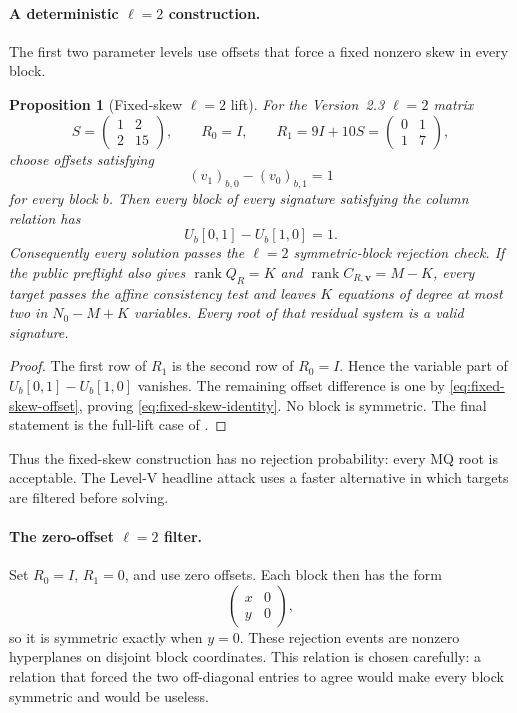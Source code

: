 \documentclass[11pt]{article}
\newtheorem{proposition}[proposition]{Proposition}
\newcommand{\rank}{\operatorname{rank}}
\begin{document}
\paragraph{A deterministic $\ell=2$ construction.}
The first two parameter levels use offsets that force a fixed nonzero skew in
every block.

\begin{proposition}[Fixed-skew $\ell=2$ lift]\label{prop:fixed-skew}
For the Version~2.3 $\ell=2$ matrix
\[
 S=\begin{pmatrix}1&2\\2&15\end{pmatrix},
 \qquad R_0=I,
 \qquad R_1=9I+10S=\begin{pmatrix}0&1\\1&7\end{pmatrix},
\]
choose offsets satisfying
\begin{equation}\label{eq:fixed-skew-offset}
 (v_1)_{b,0}-(v_0)_{b,1}=1
\end{equation}
for every block $b$.  Then every block of every signature satisfying the
column relation has
\begin{equation}\label{eq:fixed-skew-identity}
 U_b[0,1]-U_b[1,0]=1.
\end{equation}
Consequently every solution passes the $\ell=2$ symmetric-block rejection
check.  If the public preflight also gives
$\rank Q_R=K$ and $\rank C_{R,\mathbf v}=M-K$, every target passes the
affine consistency test and leaves $K$ equations of degree at most two in
$N_0-M+K$ variables.  Every root of that residual system is a valid signature.
\end{proposition}

\begin{proof}
The first row of $R_1$ is the second row of $R_0=I$.  Hence the variable part
of $U_b[0,1]-U_b[1,0]$ vanishes.  The remaining offset difference is one by
\eqref{eq:fixed-skew-offset}, proving \eqref{eq:fixed-skew-identity}.  No block
is symmetric.  The final statement is the full-lift case of
.
\end{proof}

Thus the fixed-skew construction has no rejection probability: every MQ root
is acceptable.  The Level-V headline attack uses a faster alternative in which
targets are filtered before solving.

\paragraph{The zero-offset $\ell=2$ filter.}
Set $R_0=I$, $R_1=0$, and use zero offsets.  Each block then has the form
\[
 \begin{pmatrix}x&0\\ y&0\end{pmatrix},
\]
so it is symmetric exactly when $y=0$.  These rejection events are nonzero
hyperplanes on disjoint block coordinates.  This relation is chosen
carefully: a relation that forced the two off-diagonal entries to agree would
make every block symmetric and would be useless.
\end{document}
